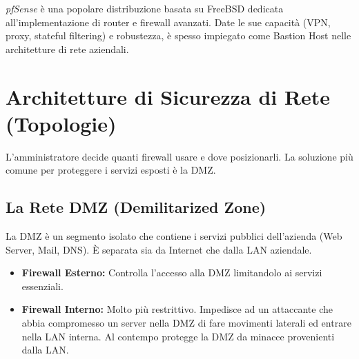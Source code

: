 \begin{exbox}[pfSense]
\textit{pfSense} è una popolare distribuzione basata su FreeBSD dedicata all'implementazione di router e firewall avanzati. Date le sue capacità (VPN, proxy, stateful filtering) e robustezza, è spesso impiegato come Bastion Host nelle architetture di rete aziendali.
\end{exbox}

\section{Architetture di Sicurezza di Rete (Topologie)}

L'amministratore decide quanti firewall usare e dove posizionarli. La soluzione più comune per proteggere i servizi esposti è la DMZ.

\subsection{La Rete DMZ (Demilitarized Zone)}
La DMZ è un segmento isolato che contiene i servizi pubblici dell'azienda (Web Server, Mail, DNS). È separata sia da Internet che dalla LAN aziendale.

\begin{center}
\end{center}

\begin{itemize}
    \item \textbf{Firewall Esterno:} Controlla l'accesso alla DMZ limitandolo ai servizi essenziali.
    \item \textbf{Firewall Interno:} Molto più restrittivo. Impedisce ad un attaccante che abbia compromesso un server nella DMZ di fare movimenti laterali ed entrare nella LAN interna. Al contempo protegge la DMZ da minacce provenienti dalla LAN.
\end{itemize}

